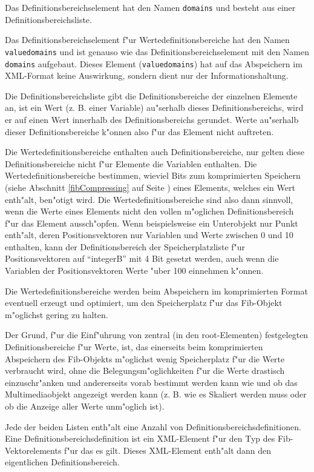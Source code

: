 Das Definitionsbereichselement hat den Namen \verb|domains| und besteht aus einer Definitionsbereichsliste.

Das Definitionsbereichselement f"ur Wertedefinitionsbereiche hat den Namen \verb|valuedomains| und ist genauso wie das Definitionsbereichselement mit den Namen \verb|domains| aufgebaut. Dieses Element (\verb|valuedomains|) hat auf das Abspeichern im XML-Format keine Auswirkung, sondern dient nur der Informationshaltung.

Die Definitionsbereichsliste gibt die Definitionsbereiche der einzelnen Elemente an, ist ein Wert (z. B. einer Variable) au"serhalb dieses Definitionsbereichs, wird er auf einen Wert innerhalb des Definitionsbereichs gerundet. Werte au"serhalb dieser Definitionsbereiche k"onnen also f"ur das Element nicht auftreten.

Die Wertedefinitionsbereiche enthalten auch Definitionsbereiche, nur gelten diese Definitionsbereiche nicht f"ur Elemente die Variablen enthalten. Die Wertedefinitionsbereiche bestimmen, wieviel Bits zum komprimierten Speichern (siehe Abschnitt \ref{fibCompressing} auf Seite \pageref{fibCompressing}) eines Elements, welches ein Wert enth"alt, ben"otigt wird. 
Die Wertedefinitionsbereiche sind also dann sinnvoll, wenn die Werte eines Elements nicht den vollen m"oglichen Definitionsbereich f"ur das Element aussch"opfen. Wenn beispielsweise ein Unterobjekt nur Punkt enth"alt, deren Positionsvektoren nur Variablen und Werte zwischen 0 und 10 enthalten, kann der Definitionsbereich der Speicherplatzliste f"ur Positionsvektoren auf ``integerB'' mit 4 Bit gesetzt werden, auch wenn die Variablen der Positionsvektoren Werte "uber 100 einnehmen k"onnen.

Die Wertedefinitionsbereiche werden beim Abspeichern im komprimierten Format eventuell erzeugt und optimiert, um den Speicherplatz f"ur das Fib-Objekt m"oglichst gering zu halten.

Der Grund, f"ur die Einf"uhrung von zentral (in den root-Elementen) festgelegten Definitionsbereiche f"ur Werte, ist, das einerseits beim komprimierten Abspeichern des Fib-Objekts m"oglichst wenig Speicherplatz f"ur die Werte verbraucht wird, ohne die Belegungsm"oglichkeiten f"ur die Werte drastisch einzuschr"anken und andererseits vorab bestimmt werden kann wie und ob das Multimediaobjekt angezeigt werden kann (z. B. wie es Skaliert werden muss oder ob die Anzeige aller Werte unm"oglich ist).

\bigskip\noindent
Jede der beiden Listen enth"alt eine Anzahl von Definitionsbereichsdefinitionen. Eine Definitionsbereichsdefinition ist ein XML-Element f"ur den Typ des Fib-Vektorelements f"ur das es gilt. Dieses XML-Element enth"alt dann den eigentlichen Definitionsbereich.


